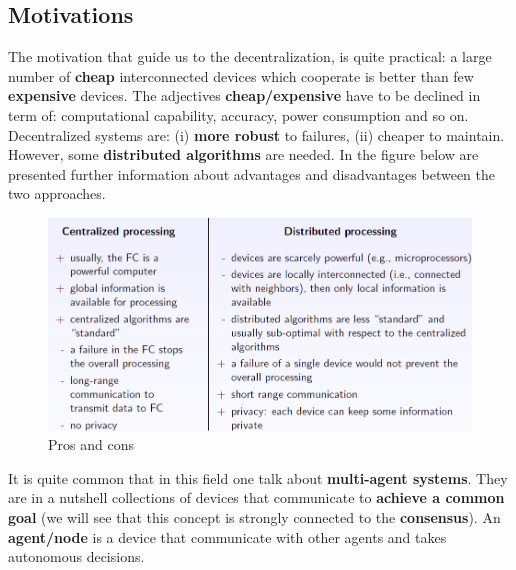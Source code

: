 \subsection{Motivations} 
The motivation that guide us to the decentralization, is quite practical: a large number of \textbf{cheap} interconnected devices which cooperate is better than few \textbf{expensive} devices. The adjectives \textbf{cheap/expensive} have to be declined in term of: computational capability, accuracy, power consumption and so on. Decentralized systems are: (i) \textbf{more robust} to failures, (ii) cheaper to maintain. However, some \textbf{distributed algorithms} are needed.
In the figure below are presented further information about advantages and disadvantages between the two approaches.\\

\begin{figure}[h]
    \centering
    \includegraphics[scale=0.8]{images/Pros_Cons.png}
    \caption{Pros and cons}
\end{figure}


It is quite common that in this field one talk about \textbf{multi-agent systems}. They are in a nutshell collections of devices that communicate to \textbf{achieve a common goal} (we will see that this concept is strongly connected to the  \textbf{consensus}). An \textbf{agent/node} is a device that communicate with other agents and takes autonomous decisions. 

